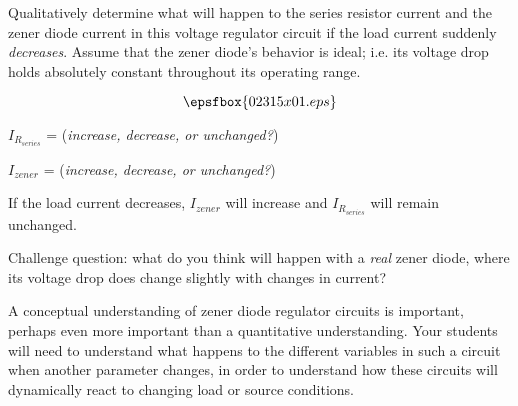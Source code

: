 

Qualitatively determine what will happen to the series resistor current and the zener diode current in this voltage regulator circuit if the load current suddenly {\it decreases}.  Assume that the zener diode's behavior is ideal; i.e. its voltage drop holds absolutely constant throughout its operating range.

$$\epsfbox{02315x01.eps}$$

$I_{R_{series}}$ = ({\it increase, decrease, or unchanged?})

\vskip 5pt

$I_{zener}$ = ({\it increase, decrease, or unchanged?})

\vskip 5pt







If the load current decreases, $I_{zener}$ will increase and $I_{R_{series}}$ will remain unchanged.

\vskip 10pt

Challenge question: what do you think will happen with a {\it real} zener diode, where its voltage drop does change slightly with changes in current?







A conceptual understanding of zener diode regulator circuits is important, perhaps even more important than a quantitative understanding.  Your students will need to understand what happens to the different variables in such a circuit when another parameter changes, in order to understand how these circuits will dynamically react to changing load or source conditions.




